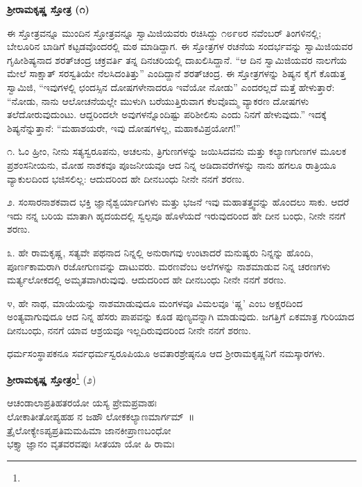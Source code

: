 \begin{center}
\textbf{ಶ‍್ರೀರಾಮಕೃಷ್ಣ ಸ್ತೋತ್ರ (೧)}
\end{center}

ಈ ಸ್ತೋತ್ರವನ್ನೂ ಮುಂದಿನ ಸ್ತೋತ್ರವನ್ನೂ ಸ್ವಾಮಿಜಿಯವರು ರಚಿಸಿದ್ದು ೧೮೯೮ರ ನವೆಂಬರ್ ತಿಂಗಳಿನಲ್ಲಿ; ಬೇಲೂರಿನ ಬಾಡಿಗೆ ಕಟ್ಟಡವೊಂದರಲ್ಲಿ ಮಠ ಮಾಡಿದ್ದಾಗ. ಈ ಸ್ತೋತ್ರಗಳ ರಚನೆಯ ಸಂದರ್ಭವನ್ನು ಸ್ವಾಮಿಜಿಯವರ ಗೃಹೀಶಿಷ್ಯನಾದ ಶರತ್‌ಚಂದ್ರ ಚಕ್ರವರ್ತಿ ತನ್ನ ದಿನಚರಿಯಲ್ಲಿ ದಾಖಲಿಸಿದ್ದಾನೆ. “ಆ ದಿನ ಸ್ವಾಮಿಜಿಯವರ ನಾಲಗೆಯ ಮೇಲೆ ಸಾಕ್ಷಾತ್ ಸರಸ್ವತಿಯೇ ನೆಲಸಿದಂತಿತ್ತು” ಎಂದಿದ್ದಾನೆ ಶರತ್‌ಚಂದ್ರ. ಈ ಸ್ತೋತ್ರಗಳನ್ನು ಶಿಷ್ಯನ ಕೈಗೆ ಕೊಡುತ್ತ ಸ್ವಾಮಿಜಿ, “ಇವುಗಳಲ್ಲಿ ಛಂದಸ್ಸಿನ ದೋಷಗಳೇನಾದರೂ ಇವೆಯೋ ನೋಡು” ಎಂದರಲ್ಲದೆ ಮತ್ತೆ ಹೇಳುತ್ತಾರೆ: “ನೋಡು, ನಾನು ಆಲೋಚನೆಯಲ್ಲೇ ಮುಳುಗಿ ಬರೆಯುತ್ತಿರುವಾಗ ಕೆಲವೊಮ್ಮ ವ್ಯಾಕರಣ ದೋಷಗಳು ತಲೆದೋರುವುದುಂಟು. ಆದ್ದರಿಂದಲೇ ಅವುಗಳನ್ನೊಂದಿಷ್ಟು ಪರಿಶೀಲಿಸು ಎಂದು ನಿನಗೆ ಹೇಳುವುದು.” ಇದಕ್ಕೆ ಶಿಷ್ಯನೆನ್ನುತ್ತಾನೆ: “ಮಹಾಶಯರೇ, ಇವು ದೋಷಗಳಲ್ಲ, ಮಹಾಕವಿಪ್ರಯೋಗ!”

೧. ಓಂ ಹ್ರೀಂ, ನೀನು ಸತ್ಯಸ್ವರೂಪನು, ಅಚಲನು, ತ್ರಿಗುಣಗಳನ್ನು ಜಯಿಸಿದವನು ಮತ್ತು ಕಲ್ಯಾಣಗುಣಗಳ ಮೂಲಕ ಪ್ರಶಂಸನೀಯನು, ಮೋಹ ನಾಶಕವೂ ಪೂಜನೀಯವೂ ಆದ ನಿನ್ನ ಅಡಿದಾವರೆಗಳನ್ನು ನಾನು ಹಗಲೂ ರಾತ್ರಿಯೂ ವ್ಯಾಕುಲದಿಂದ ಭಜಿಸಲಿಲ್ಲ: ಆದುದರಿಂದ ಹೇ ದೀನಬಂಧು ನೀನೇ ನನಗೆ ಶರಣು.

೨. ಸಂಸಾರನಾಶಕವಾದ ಭಕ್ತಿ ಜ್ಞಾನೈಶ್ವರ್ಯಾದಿಗಳು ಮತ್ತು ಭಜನೆ ಇವು ಮಹಾತತ್ತ್ವವನ್ನು ಹೊಂದಲು ಸಾಕು. ಆದರೆ ಇದು ನನ್ನ ಬರಿಯ ಮಾತಾಗಿ ಹೃದಯದಲ್ಲಿ ಸ್ವಲ್ಪವೂ ಹೊಳೆಯದೆ ಇರುವುದರಿಂದ ಹೇ ದೀನ ಬಂಧು, ನೀನೇ ನನಗೆ ಶರಣು.

೩. ಹೇ ರಾಮಕೃಷ್ಣ, ಸತ್ಯವೇ ಪಥನಾದ ನಿನ್ನಲ್ಲಿ ಅನುರಾಗವು ಉಂಟಾದರೆ ಮನುಷ್ಯರು ನಿನ್ನನ್ನು ಹೊಂದಿ, ಪೂರ್ಣಕಾಮರಾಗಿ ರಜೋಗುಣವನ್ನು ದಾಟುವರು. ಮರಣವೆಂಬ ಅಲೆಗಳನ್ನು ನಾಶಮಾಡುವ ನಿನ್ನ ಚರಣಗಳು ಮರ್ತ್ಯಲೋಕದಲ್ಲಿ ಅಮೃತವಾಗಿರುವುವು. ಆದುದರಿಂದ ಹೇ ದೀನಬಂಧು ನೀನೇ ನನಗೆ ಶರಣು.

೪, ಹೇ ನಾಥ, ಮಾಯೆಯನ್ನು ನಾಶಮಾಡುವುದೂ ಮಂಗಳವೂ ವಿಮಲವೂ ‘ಷ್ಣ’ ಎಂಬ ಅಕ್ಷರದಿಂದ ಅಂತ್ಯವಾಗುವುದೂ ಆದ ನಿನ್ನ ಹೆಸರು ಪಾಪವನ್ನು ಕೂಡ ಪುಣ್ಯವನ್ನಾಗಿ ಮಾಡುವುದು. ಜಗತ್ತಿಗೆ ಏಕಮಾತ್ರ ಗುರಿಯಾದ ದೀನಬಂಧು, ನನಗೆ ಯಾವ ಆಶ್ರಯವೂ ಇಲ್ಲದಿರುವುದರಿಂದ ನೀನೇ ನನಗೆ ಶರಣು.

ಧರ್ಮಸಂಸ್ಥಾಪಕನೂ ಸರ್ವಧರ್ಮಸ್ವರೂಪಿಯೂ ಅವತಾರಶ್ರೇಷ್ಠನೂ ಆದ ಶ‍್ರೀರಾಮಕೃಷ್ಣನಿಗೆ ನಮಸ್ಕಾರಗಳು.

\begin{center}
\textbf{ಶ‍್ರೀರಾಮಕೃಷ್ಣ ಸ್ತೋತ್ರಂ}\footnote{} (೨)
\end{center}

\begin{myquote}
ಆಚಂಡಾಲಾಪ್ರತಿಹತರಯೋ ಯಸ್ಯ ಪ್ರೇಮಪ್ರವಾಹಃ\\ಲೋಕಾತೀತೋಪ್ಯಹಹ ನ ಜಹೌ ಲೋಕಕಲ್ಯಾಣಮಾರ್ಗಮ್~॥\\
ತ್ರೈಲೋಕ್ಯೇಽಪ್ಯಪ್ರತಿಮಮಹಿಮಾ ಜಾನಕೀಪ್ರಾಣಬಂಧೋ\\ಭಕ್ತ್ಯಾ ಜ್ಞಾನಂ ವೃತವರವಪುಃ ಸೀತಯಾ ಯೋ ಹಿ ರಾಮಃ
\end{myquote}

